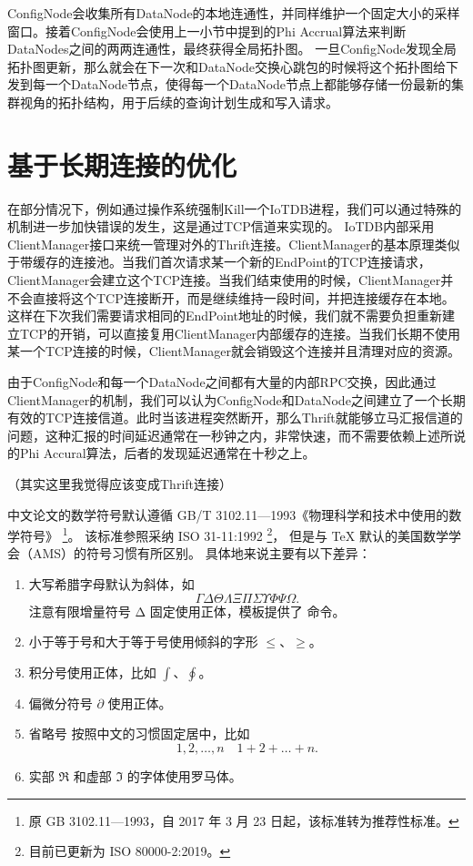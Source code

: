 ConfigNode会收集所有DataNode的本地连通性，并同样维护一个固定大小的采样窗口。接着ConfigNode会使用上一小节中提到的Phi Accrual算法来判断DataNodes之间的两两连通性，最终获得全局拓扑图。
一旦ConfigNode发现全局拓扑图更新，那么就会在下一次和DataNode交换心跳包的时候将这个拓扑图给下发到每一个DataNode节点，使得每一个DataNode节点上都能够存储一份最新的集群视角的拓扑结构，用于后续的查询计划生成和写入请求。


\section{基于长期连接的优化}

在部分情况下，例如通过操作系统强制Kill一个IoTDB进程，我们可以通过特殊的机制进一步加快错误的发生，这是通过TCP信道来实现的。
IoTDB内部采用ClientManager接口来统一管理对外的Thrift连接。ClientManager的基本原理类似于带缓存的连接池。当我们首次请求某一个新的EndPoint的TCP连接请求，ClientManager会建立这个TCP连接。当我们结束使用的时候，ClientManager并不会直接将这个TCP连接断开，而是继续维持一段时间，并把连接缓存在本地。这样在下次我们需要请求相同的EndPoint地址的时候，我们就不需要负担重新建立TCP的开销，可以直接复用ClientManager内部缓存的连接。当我们长期不使用某一个TCP连接的时候，ClientManager就会销毁这个连接并且清理对应的资源。

由于ConfigNode和每一个DataNode之间都有大量的内部RPC交换，因此通过ClientManager的机制，我们可以认为ConfigNode和DataNode之间建立了一个长期有效的TCP连接信道。此时当该进程突然断开，那么Thrift就能够立马汇报信道的问题，这种汇报的时间延迟通常在一秒钟之内，非常快速，而不需要依赖上述所说的Phi Accural算法，后者的发现延迟通常在十秒之上。


（其实这里我觉得应该变成Thrift连接）




中文论文的数学符号默认遵循 GB/T 3102.11—1993《物理科学和技术中使用的数学符号》
\footnote{原 GB 3102.11—1993，自 2017 年 3 月 23 日起，该标准转为推荐性标准。}。
该标准参照采纳 ISO 31-11:1992 \footnote{目前已更新为 ISO 80000-2:2019。}，
但是与 \TeX{} 默认的美国数学学会（AMS）的符号习惯有所区别。
具体地来说主要有以下差异：
\begin{enumerate}
  \item 大写希腊字母默认为斜体，如
    \begin{equation*}
      \Gamma \Delta \Theta \Lambda \Xi \Pi \Sigma \Upsilon \Phi \Psi \Omega.
    \end{equation*}
    注意有限增量符号 $\increment$ 固定使用正体，模板提供了  命令。
  \item 小于等于号和大于等于号使用倾斜的字形 $\le$、$\ge$。
  \item 积分号使用正体，比如 $\int$、$\oint$。
  \item
    偏微分符号 $\partial$ 使用正体。
  \item
    省略号  按照中文的习惯固定居中，比如
    \begin{equation*}
      1, 2, \dots, n \quad 1 + 2 + \dots + n.
    \end{equation*}
  \item
    实部 $\Re$ 和虚部 $\Im$ 的字体使用罗马体。
\end{enumerate}


